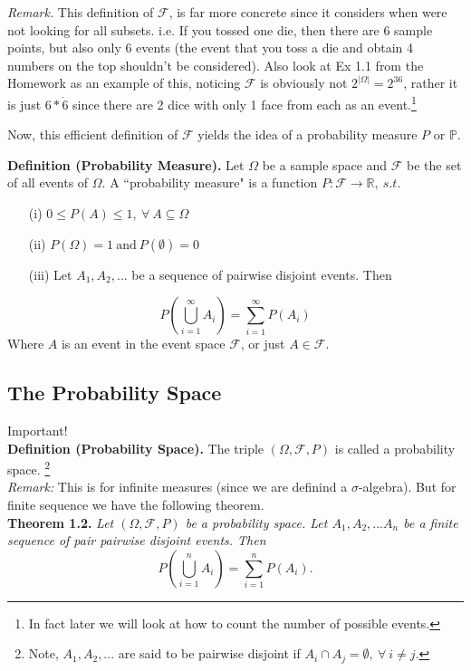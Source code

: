 \documentclass[12pt]{book}
\begin{document}
\noindent \textit{Remark. } This definition of $\mathcal{F}$, is far more concrete since it considers when were not looking for all subsets. 
i.e. If you tossed one die, then there are 6 sample points, but also only 6 events (the event that you toss a die and obtain 4 numbers on the top shouldn't be considered). Also look at Ex 1.1 from the Homework as an example of this, noticing $\mathcal{F}$ is obviously not $2^{|\Omega|}=2^{36}$, rather it is just $6*\dot6$ since there are 2 dice with only 1 face from each as an event.\footnote{In fact later we will look at how to count the number of possible events.}

Now, this efficient definition of $\mathcal{F}$ yields the idea of a probability measure $P$ or $\mathbb{P}$.

\noindent \textbf{Definition (Probability Measure). } Let $\Omega$ be a sample space and $\mathcal{F}$ be the set of all events of $\Omega$. 
A ``probability measure" is a function $P: \mathcal{F} \rightarrow \mathbb{R},~s.t.$
\begin{itemize}
\item[(i)] $0\leq P(A)\leq 1,~\forall~ A\subseteq \Omega$
\item[(ii)] $P(\Omega) =1 ~\text{and}~ P(\emptyset) =0$
\item[\hypertarget{axiom(iii)}{(iii)}] Let $A_1, A_2, ...$ be a sequence of pairwise disjoint events. Then 
\end{itemize}
$$P\left( \bigcup\limits_{i=1}^{\infty} A_i\right) = \sum\limits_{i=1}^{\infty}P(A_i)$$
\noindent Where $A$ is an event in the event space $\mathcal{F}$, or just $A\in\mathcal{F}$.

\subsection{The Probability Space}
Important! \\
\noindent \textbf{Definition (Probability Space). } The triple $(\Omega,\mathcal{F}, P)$ is called a probability space. \footnote{Note, $A_1, A_2, ...$ are said to be pairwise disjoint if $A_i \cap A_j = \emptyset,~\forall~ i\neq j$.}\\

\noindent\textit{Remark: } This is for infinite measures (since we are definind a $\sigma$-algebra). But for finite sequence we have the following theorem.\\

\noindent \textbf{Theorem 1.2. } \textit{Let $(\Omega, \mathcal{F}, P)$ be a probability space. Let $A_1, A_2, ...A_n$ be a finite sequence of pair pairwise disjoint events. Then 
$$P\left( \bigcup\limits_{i=1}^{n} A_i\right) = \sum\limits_{i=1}^{n}P(A_i).$$}
\end{document}
